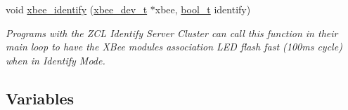 \begin{DoxyCompactItemize}
void \hyperlink{group__xbee__device_ga42768d8f8aa841ed4f42396cff2815aa}{xbee\+\_\+identify} (\hyperlink{structxbee__dev__t}{xbee\+\_\+dev\+\_\+t} $\ast$xbee, \hyperlink{group__hal__dos_ga04dd5074964518403bf944f2b240a5f8}{bool\+\_\+t} identify)
\begin{DoxyCompactList}\small\item\em Programs with the Z\+CL Identify Server Cluster can call this function in their main loop to have the X\+Bee module\textquotesingle{}s association L\+ED flash fast (100ms cycle) when in Identify Mode. \end{DoxyCompactList}\end{DoxyCompactItemize}
\subsection*{Variables}
